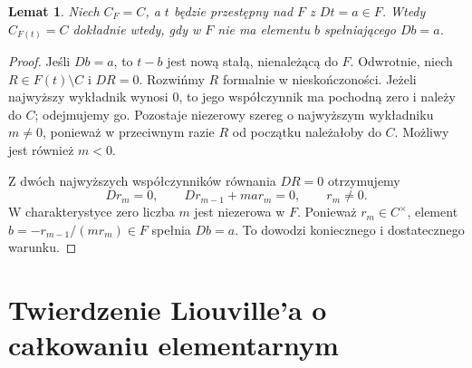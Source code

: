 \documentclass[11pt,a4paper,oneside]{book}
\numberwithin{equation}{section}
\theoremstyle{plain}
\newtheorem{lemat}[twierdzenie]{Lemat}
\theoremstyle{definition}
\theoremstyle{remark}
\begin{document}
\begin{lemat}
Niech $C_F=C$, a $t$ będzie przestępny nad $F$ z $Dt=a\in F$. Wtedy $C_{F(t)}=C$ dokładnie wtedy, gdy w $F$ nie ma elementu $b$ spełniającego $Db=a$.
\end{lemat}
\begin{proof}
Jeśli $Db=a$, to $t-b$ jest nową stałą, nienależącą do $F$. Odwrotnie, niech $R\in F(t)\setminus C$ i $DR=0$. Rozwińmy $R$ formalnie w nieskończoności. Jeżeli najwyższy wykładnik wynosi $0$, to jego współczynnik ma pochodną zero i należy do $C$; odejmujemy go. Pozostaje niezerowy szereg o najwyższym wykładniku $m\ne0$, ponieważ w przeciwnym razie $R$ od początku należałoby do $C$. Możliwy jest również $m<0$.

Z dwóch najwyższych współczynników równania $DR=0$ otrzymujemy
\[
Dr_m=0,\qquad Dr_{m-1}+m a r_m=0,\qquad r_m\ne0.
\]
W charakterystyce zero liczba $m$ jest niezerowa w $F$. Ponieważ $r_m\in C^\times$, element $b=-r_{m-1}/(mr_m)\in F$ spełnia $Db=a$. To dowodzi koniecznego i dostatecznego warunku.
\end{proof}

\section{Twierdzenie Liouville'a o całkowaniu elementarnym}
\end{document}
